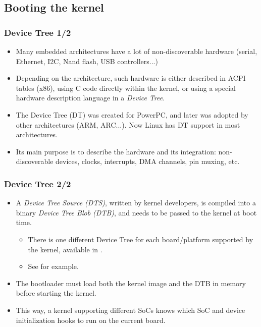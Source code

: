 \subsection{Booting the kernel}

\begin{frame}
  \frametitle{Device Tree 1/2}
  \begin{itemize}
  \item Many embedded architectures have a lot of non-discoverable
    hardware (serial, Ethernet, I2C, Nand flash, USB  controllers...)
  \item Depending on the architecture, such hardware is either
    described in ACPI tables (x86), using C code directly within the kernel,
    or using a special hardware description language in a {\em Device Tree}.
  \item The Device Tree (DT) was created for PowerPC, and later was
    adopted by other architectures (ARM, ARC...). Now Linux
    has DT support in most architectures.
  \item Its main purpose is to describe the hardware and its integration:
    non-discoverable devices, clocks, interrupts, DMA channels, pin
    muxing, etc.
  \end{itemize}
\end{frame}

\begin{frame}
  \frametitle{Device Tree 2/2}
  \begin{itemize}
  \item A {\em Device Tree Source (DTS)}, written by kernel developers,
    is compiled into a binary {\em Device Tree Blob (DTB)}, and needs to
    be passed to the kernel at boot time.
    \begin{itemize}
    \item There is one different Device Tree for each board/platform
      supported by the kernel, available in
      .
     \item See  for
      example.
    \end{itemize}
  \item The bootloader must load both the kernel image and the DTB
    in memory before starting the kernel.
  \item This way, a kernel supporting different SoCs knows which
    SoC and device initialization hooks to run on the current board.
  \end{itemize}
\end{frame}
